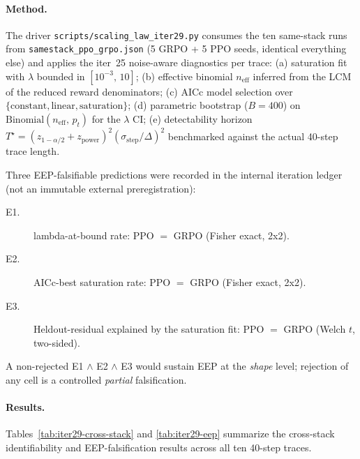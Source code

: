 \paragraph{Method.}
The driver \texttt{scripts/scaling\_law\_iter29.py} consumes the ten
same-stack runs from \texttt{samestack\_ppo\_grpo.json} (5 GRPO + 5 PPO
seeds, identical everything else) and applies the iter~25 noise-aware
diagnostics per trace:
(a) saturation fit with $\lambda$ bounded in $[10^{-3},\,10]$; (b)
effective binomial $n_{\mathrm{eff}}$ inferred from the LCM of the
reduced reward denominators;
(c) AICc model selection over $\{\text{constant}, \text{linear},
\text{saturation}\}$; (d) parametric bootstrap ($B=400$) on
$\mathrm{Binomial}(n_{\mathrm{eff}},\,p_t)$ for the $\lambda$ CI; (e)
detectability horizon $T^{\star}=(z_{1-\alpha/2}+z_{\mathrm{power}})^{2}
(\sigma_{\text{step}}/\Delta)^{2}$
benchmarked against the actual 40-step trace length.

Three EEP-falsifiable predictions were recorded in the internal iteration ledger (not an immutable external preregistration):
\begin{description}
\item[E1.] lambda-at-bound rate: PPO $=$ GRPO (Fisher exact, 2x2).
\item[E2.] AICc-best saturation rate: PPO $=$ GRPO (Fisher exact, 2x2).
\item[E3.] Heldout-residual explained by the saturation fit:
  PPO $=$ GRPO (Welch $t$, two-sided).
\end{description}
A non-rejected E1 $\wedge$ E2 $\wedge$ E3 would sustain EEP at the
\emph{shape} level; rejection of any cell is a controlled
\emph{partial} falsification.

\paragraph{Results.}
Tables~\ref{tab:iter29-cross-stack} and \ref{tab:iter29-eep} summarize
the cross-stack identifiability and EEP-falsification results across
all ten 40-step traces.

